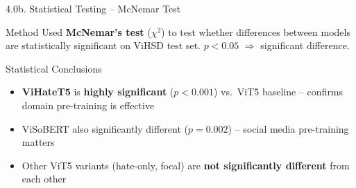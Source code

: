 \documentclass[11pt, aspectratio=169]{beamer}
\begin{document}
\begin{frame}[shrink=8]{4.0b. Statistical Testing -- McNemar Test}

\begin{block}{Method}
  Used \textbf{McNemar's test} ($\chi^2$) to test whether differences between models are statistically significant on ViHSD test set. $p < 0.05$ $\Rightarrow$ significant difference.
\end{block}

\vspace{0.2cm}
\begin{table}[h]
  \centering
  \caption{McNemar's test results on ViHSD (vs.\ ViT5 balanced baseline)}
  \vspace{0.2cm}
\end{table}

\begin{block}{Statistical Conclusions}
  \begin{itemize}
    \item \textbf{ViHateT5} is \textbf{highly significant} ($p < 0.001$) vs.\ ViT5 baseline -- confirms domain pre-training is effective
    \item ViSoBERT also significantly different ($p = 0.002$) -- social media pre-training matters
    \item Other ViT5 variants (hate-only, focal) are \textbf{not significantly different} from each other
  \end{itemize}
\end{block}
\end{frame}
\end{document}
